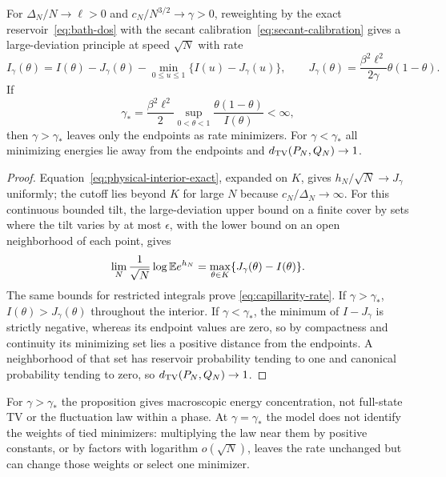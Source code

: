 \begin{proposition}
\label{prop:capillarity-ldp}
For $\Delta_N/N\to\ell>0$ and $c_N/N^{3/2}\to\gamma>0$, reweighting
by the exact reservoir~\eqref{eq:bath-dos} with the secant
calibration~\eqref{eq:secant-calibration} gives a large-deviation
principle at speed $\sqrt N$ with rate
\begin{equation}
 I_\gamma(\theta)=I(\theta)-J_\gamma(\theta)
 -\min_{0\le u\le1}\{I(u)-J_\gamma(u)\},
 \qquad
 J_\gamma(\theta)=\frac{\beta^2\ell^2}{2\gamma}\theta(1-\theta).
 \label{eq:capillarity-rate}
\end{equation}
If
\begin{equation}
 \gamma_*=\frac{\beta^2\ell^2}{2}
 \sup_{0<\theta<1}\frac{\theta(1-\theta)}{I(\theta)}<\infty,
 \label{eq:capillarity-threshold}
\end{equation}
then $\gamma>\gamma_*$ leaves only the endpoints as rate minimizers.
For $\gamma<\gamma_*$ all minimizing energies lie away from the
endpoints and $d_{\mathrm{TV}}(P_N,Q_N)\to1$.
\end{proposition}
\begin{proof}
Equation~\eqref{eq:physical-interior-exact}, expanded on $K$, gives
$h_N/\sqrt N\to J_\gamma$ uniformly; the cutoff lies beyond $K$ for
large $N$ because $c_N/\Delta_N\to\infty$. For this continuous
bounded tilt, the large-deviation upper bound on a finite cover by
sets where the tilt varies by at most $\epsilon$, with the lower
bound on an open neighborhood of each point, gives
\[
 \lim_N\frac1{\sqrt N}\log\mathbb E e^{h_N}
 =\max_{\theta\in K}\{J_\gamma(\theta)-I(\theta)\}.
\]
The same bounds for restricted integrals prove
\eqref{eq:capillarity-rate}. If $\gamma>\gamma_*$,
$I(\theta)>J_\gamma(\theta)$ throughout the interior.
If $\gamma<\gamma_*$, the minimum of $I-J_\gamma$ is strictly
negative, whereas its endpoint values are zero, so by compactness
and continuity its minimizing set lies a positive distance from the
endpoints. A neighborhood of that set has reservoir probability
tending to one and canonical probability tending to zero, so
$d_{\mathrm{TV}}(P_N,Q_N)\to1$.
\end{proof}

For $\gamma>\gamma_*$ the proposition gives macroscopic energy
concentration, not full-state TV or the fluctuation law within a
phase. At $\gamma=\gamma_*$ the model does not identify the weights
of tied minimizers: multiplying the law near them by positive
constants, or by factors with logarithm $o(\sqrt N)$, leaves the rate
unchanged but can change those weights or select one minimizer.

